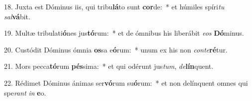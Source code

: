 18. Juxta est Dóminus iis, qui tribu\textbf{lá}to sunt \textbf{cor}de:~*  et húmiles spíri\textit{tu} \textit{sal}\textbf{vá}bit.\

19. Multæ tribulati\textbf{ó}nes jus\textbf{tó}rum:~*  et de ómnibus his liberábit \textit{e}\textit{os} \textbf{Dó}minus.\

20. Custódit Dóminus ómnia \textbf{os}sa e\textbf{ó}rum:~*  unum ex his non \textit{con}\textit{te}\textbf{ré}tur.\

21. Mors pecca\textbf{tó}rum \textbf{pés}sima:~*  et qui odérunt jus\textit{tum}, \textit{de}\textbf{lín}quent.\

22. Rédimet Dóminus ánimas ser\textbf{vó}rum su\textbf{ó}rum:~*  et non delínquent omnes qui spe\textit{rant} \textit{in} \textbf{e}o.\

